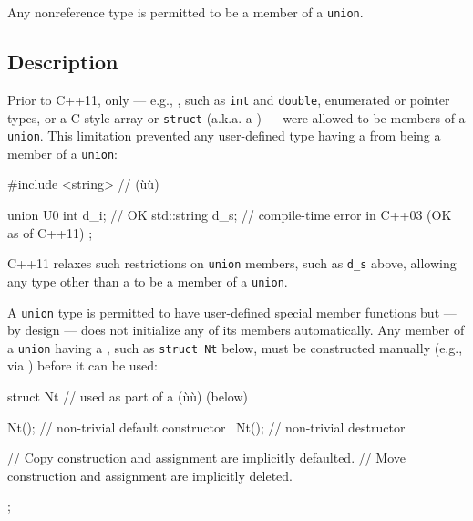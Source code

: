 
Any nonreference type is permitted to be a member of a \lstinline!union!.

\subsection[Description]{Description}\label{unrestrictedunion-description}

Prior to C++11, only  --- e.g.,
, such as \lstinline!int! and \lstinline!double!,
enumerated or pointer types, or a C-style array or \lstinline!struct!
(a.k.a. a ) --- were allowed to be members of a
\lstinline!union!. This limitation prevented any user-defined type having
a  from being a member of a
\lstinline!union!:

\begin{emcppshiddenlisting}[emcppsbatch=e1]
#include <string>  // (ù{}ù)
\end{emcppshiddenlisting}
\begin{emcppslisting}[emcppsbatch=e1]
union U0
{
    int         d_i;  // OK
    std::string d_s;  // compile-time error in C++03 (OK as of C++11)
};
\end{emcppslisting}

\noindent C++11 relaxes such restrictions on \lstinline!union! members, such as
\lstinline!d_s! above, allowing any type other than a  to be a member of a \lstinline!union!.

A \lstinline!union! type is permitted to have user-defined special member
functions but --- by design --- does not initialize any of its members
automatically. Any member of a \lstinline!union! having a
, such as \lstinline!struct!~\lstinline!Nt!
below, must be constructed manually (e.g., via ) before it can be used:

\begin{emcppslisting}[emcppsbatch=e2]
struct Nt  // used as part of a (ù{}ù) (below)
{
    Nt();   // non-trivial default constructor
    ~Nt();  // non-trivial destructor

    // Copy construction and assignment are implicitly defaulted.
    // Move construction and assignment are implicitly deleted.
};
\end{emcppslisting}


